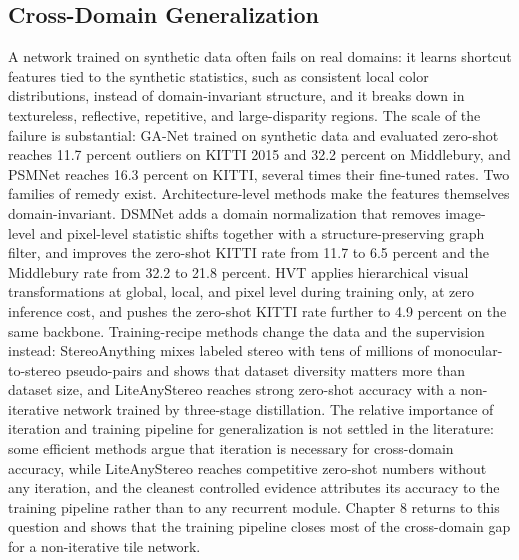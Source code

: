 \subsection{Cross-Domain Generalization}
A network trained on synthetic data often fails on real domains: it
learns shortcut features tied to the synthetic statistics, such as
consistent local color distributions, instead of domain-invariant
structure, and it breaks down in textureless, reflective, repetitive, and
large-disparity regions. The scale of the failure is substantial: GA-Net
trained on synthetic data and evaluated zero-shot reaches 11.7 percent
outliers on KITTI 2015 and 32.2 percent on Middlebury, and PSMNet reaches
16.3 percent on KITTI, several times their fine-tuned rates. Two families
of remedy exist. Architecture-level methods make the features themselves
domain-invariant. DSMNet \cite{zhang2020dsmnet} adds a domain
normalization that removes image-level and pixel-level statistic shifts
together with a structure-preserving graph filter, and improves the
zero-shot KITTI rate from 11.7 to 6.5 percent and the Middlebury rate
from 32.2 to 21.8 percent. HVT \cite{chang2023hvt} applies hierarchical
visual transformations at global, local, and pixel level during training
only, at zero inference cost, and pushes the zero-shot KITTI rate further
to 4.9 percent on the same backbone. Training-recipe methods change the
data and the supervision instead: StereoAnything
\cite{guo2024stereoanything} mixes labeled stereo with tens of millions
of monocular-to-stereo pseudo-pairs and shows that dataset diversity
matters more than dataset size, and LiteAnyStereo
\cite{jing2025liteanystereo} reaches strong zero-shot accuracy with a
non-iterative network trained by three-stage distillation. The relative
importance of iteration and training pipeline for generalization is not
settled in the literature: some efficient methods argue that iteration is
necessary for cross-domain accuracy, while LiteAnyStereo reaches
competitive zero-shot numbers without any iteration, and the cleanest
controlled evidence attributes its accuracy to the training pipeline
rather than to any recurrent module. Chapter 8 returns to this question
and shows that the training pipeline closes most of the cross-domain gap
for a non-iterative tile network.

\FloatBarrier
